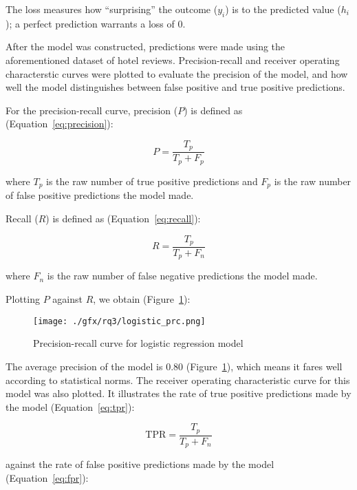\documentclass[12pt, a4paper]{pancake-article}
\begin{document}
The loss measures how ``surprising'' the outcome ($y_i$) is to the predicted
value ($h_i$); a perfect prediction warrants a loss of $0$.

After the model was constructed, predictions were made using the aforementioned
dataset of hotel reviews. Precision-recall and receiver operating characterstic curves
were plotted to evaluate the precision of the model,
and how well the model distinguishes between false positive and true positive predictions.

For the precision-recall curve, precision (\(P\)) is defined as (Equation~\ref{eq:precision}):

\begin{equation}
	P = \frac{T_p}{T_p + F_p}
	\label{eq:precision}
\end{equation}

where \(T_p\) is the raw number of true positive predictions
and \(F_p\) is the raw number of false positive predictions the model made.

Recall (\(R\)) is defined as (Equation~\ref{eq:recall}):

\begin{equation}
	R = \frac{T_p}{T_p + F_n}
	\label{eq:recall}
\end{equation}

where \(F_n\) is the raw number of false negative predictions
the model made.

Plotting \(P\) against \(R\), we obtain (Figure~\ref{fig:prc-logreg}):
\begin{figure}
	\begin{center}
		\texttt{[image: ./gfx/rq3/logistic\_prc.png]}
	\end{center}
	\caption{Precision-recall curve for logistic regression model}
	\label{fig:prc-logreg}
\end{figure}

The average precision of the model is $0.80$ (Figure~\ref{fig:prc-logreg}),
which means it fares well according to statistical norms. The receiver
operating characteristic curve for this model was also plotted.
It illustrates the rate of true positive predictions made by the model (Equation~\ref{eq:tpr}):

\begin{equation}
	\text{TPR} = \frac{T_p}{T_p + F_n}
	\label{eq:tpr}
\end{equation}

against the rate of false positive predictions made by the model (Equation~\ref{eq:fpr}):
\end{document}
